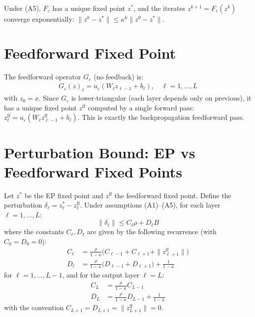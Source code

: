 \documentclass[11pt]{article}
\begin{document}
\begin{corollary}
Under (A5), $F_\varepsilon$ has a unique fixed point $z^*$, and the
iterates $z^{k+1} = F_\varepsilon(z^k)$ converge exponentially:
$\|z^k - z^*\| \le \kappa^k \|z^0 - z^*\|$.
\end{corollary}

\section{Feedforward Fixed Point}

The feedforward operator $G_\varepsilon$ (no feedback) is:
\begin{align}
  G_\varepsilon(z)_\ell = u_\varepsilon(W_\ell z_{\ell-1} + b_\ell),
  \quad \ell=1,\dots,L
\end{align}
with $z_0 = x$. Since $G_\varepsilon$ is lower-triangular (each layer
depends only on previous), it has a unique fixed point $z^{\text{ff}}$
computed by a single forward pass:
$z^{\text{ff}}_\ell = u_\varepsilon(W_\ell z^{\text{ff}}_{\ell-1} + b_\ell)$.
This is exactly the backpropagation feedforward pass.

\section{Perturbation Bound: EP vs Feedforward Fixed Points}

\begin{theorem}
\label{thm:perturbation}
Let $z^*$ be the EP fixed point and $z^{\text{ff}}$ the feedforward
fixed point. Define the perturbation $\delta_\ell = z^*_\ell -
z^{\text{ff}}_\ell$. Under assumptions (A1)--(A5), for each layer
$\ell = 1,\dots,L$:
\begin{equation}
  \|\delta_\ell\| \le C_\ell \rho + D_\ell B
\end{equation}
where the constants $C_\ell, D_\ell$ are given by the following
recurrence (with $C_0 = D_0 = 0$):
\begin{align}
  C_\ell &= \frac{\rho}{1-\kappa}\Big(
    C_{\ell-1} + C_{\ell+1} + \|z^{\text{ff}}_{\ell+1}\| \Big) \\
  D_\ell &= \frac{\rho}{1-\kappa}\Big(
    D_{\ell-1} + D_{\ell+1} \Big) + \frac{1}{1-\kappa}
\end{align}
for $\ell=1,\dots,L-1$, and for the output layer $\ell=L$:
\begin{align}
  C_L &= \frac{\rho}{1-\kappa} C_{L-1} \\
  D_L &= \frac{\rho}{1-\kappa} D_{L-1} + \frac{1}{1-\kappa}
\end{align}
with the convention $C_{L+1} = D_{L+1} = \|z^{\text{ff}}_{L+1}\| = 0$.
\end{theorem}
\end{document}
